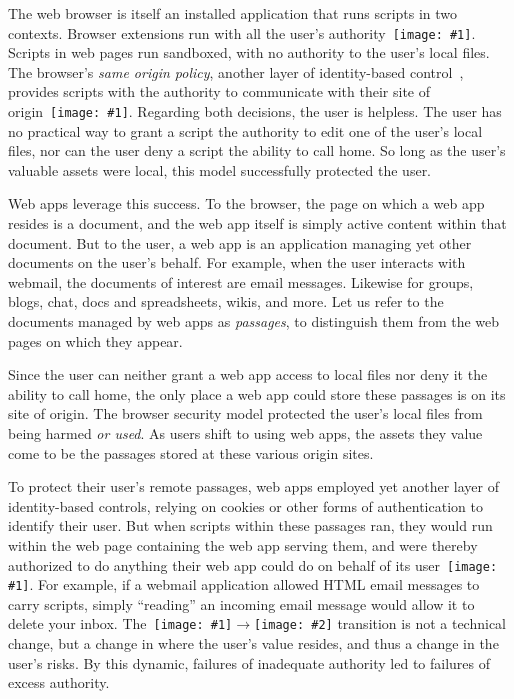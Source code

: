 \documentclass[letterpaper,twocolumn,10pt]{article}
\newcommand{\q}[1]{{\texttt{[image: \#1]}}}
\newcommand{\qq}[2]{{\texttt{[image: \#1]}}$\rightarrow${\texttt{[image: \#2]}}}
\begin{document}
The web browser is itself an installed application that runs scripts in two 
contexts. Browser extensions run with all the user's authority~\q{2}. Scripts 
in web pages run sandboxed, with no authority to the user's local files. The 
browser's \emph{same origin policy}, another layer of identity-based 
control~\cite{mashupos}, provides scripts with the authority to communicate 
with their site of origin~\q{3}. Regarding both decisions, the user is 
helpless. The user has no practical way to grant a script the authority to 
edit one of the user's local files, nor can the user deny a script the 
ability to call home. So long as the user's valuable assets were local, this 
model successfully protected the user.

Web apps leverage this success. To the browser, the page on which a web app 
resides is a document, and the web app itself is simply active content within 
that document. But to the user, a web app is an application managing yet 
other documents on the user's behalf. For example, when the user interacts 
with webmail, the documents of interest are email messages. Likewise for 
groups, blogs, chat, docs and spreadsheets, wikis, and more. Let us refer to 
the documents managed by web apps as \emph{passages}, to distinguish them 
from the web pages on which they appear.

Since the user can neither grant a web app access to local files nor deny it 
the ability to call home, the only place a web app could store these passages 
is on its site of origin. The browser security model protected the user's 
local files from being harmed \emph{or used}. As users shift to using web 
apps, the assets they value come to be the passages stored at these various 
origin sites. 

To protect their user's remote passages, web apps employed yet another layer 
of identity-based controls, relying on cookies or other forms of 
authentication to identify their user. But when scripts within these passages 
ran, they would run within the web page containing the web app serving them, 
and were thereby authorized to do anything their web app could do on behalf 
of its user~\q{4}. For example, if a webmail application allowed HTML email 
messages to carry scripts, simply ``reading'' an incoming email message would 
allow it to delete your inbox. The~\qq{3}{4} transition is not a technical 
change, but a change in where the user's value resides, and thus a change in 
the user's risks. By this dynamic, failures of inadequate authority led to 
failures of excess authority.
\end{document}
